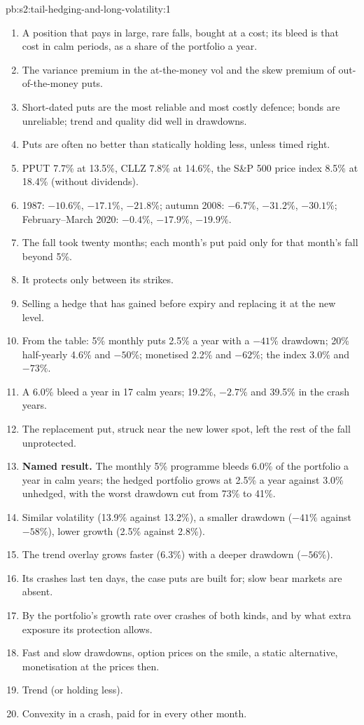 \begin{solution}{pb:s2:tail-hedging-and-long-volatility:1}
\begin{enumerate}
\item A position that pays in large, rare falls, bought at a cost; its bleed is that cost in calm periods, as a share of the portfolio a year.
\item The variance premium in the at-the-money vol and the skew premium of out-of-the-money puts.
\item Short-dated puts are the most reliable and most costly defence; bonds are unreliable; trend and quality did well in drawdowns.
\item Puts are often no better than statically holding less, unless timed right.
\item PPUT 7.7\% at 13.5\%, CLLZ 7.8\% at 14.6\%, the S\&P 500 price index 8.5\% at 18.4\% (without dividends).
\item 1987: $-10.6\%$, $-17.1\%$, $-21.8\%$; autumn 2008: $-6.7\%$, $-31.2\%$, $-30.1\%$; February--March 2020: $-0.4\%$, $-17.9\%$, $-19.9\%$.
\item The fall took twenty months; each month's put paid only for that month's fall beyond 5\%.
\item It protects only between its strikes.
\item Selling a hedge that has gained before expiry and replacing it at the new level.
\item From the table: 5\% monthly puts 2.5\% a year with a $-41\%$ drawdown; 20\% half-yearly 4.6\% and $-50\%$; monetised 2.2\% and $-62\%$; the
index 3.0\% and $-73\%$.
\item A 6.0\% bleed a year in 17 calm years; 19.2\%, $-2.7\%$ and 39.5\% in the crash years.
\item The replacement put, struck near the new lower spot, left the rest of the fall unprotected.
\item \textbf{Named result.} The monthly 5\% programme bleeds 6.0\% of the portfolio a year in calm years; the hedged portfolio grows at 2.5\% a year
against 3.0\% unhedged, with the worst drawdown cut from 73\% to 41\%.
\item Similar volatility (13.9\% against 13.2\%), a smaller drawdown ($-41\%$ against $-58\%$), lower growth (2.5\% against 2.8\%).
\item The trend overlay grows faster (6.3\%) with a deeper drawdown ($-56\%$).
\item Its crashes last ten days, the case puts are built for; slow bear markets are absent.
\item By the portfolio's growth rate over crashes of both kinds, and by what extra exposure its protection allows.
\item Fast and slow drawdowns, option prices on the smile, a static alternative, monetisation at the prices then.
\item Trend (or holding less).
\item Convexity in a crash, paid for in every other month.
\end{enumerate}
\end{solution}

